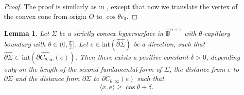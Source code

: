 \documentclass[11pt,reqno]{amsart}
\newtheorem{lem}[thm]{Lemma}
\theoremstyle{definition}
\theoremstyle{remark}
\numberwithin{equation}{section}
\renewcommand{\(}{\left(}
\renewcommand{\)}{\right)}
\renewcommand{\-}{\overline}
\begin{document}
\begin{proof}
	The proof is similarly as in \cite[Lemma 10]{Lambert-Scheuer2016}, except that now we translate the vertex of the convex cone from origin $O$ to $\cos\theta e_0$.
\end{proof}
\begin{lem}\label{Lem-es-height}
	Let $\Sigma$ be a strictly convex hypersurface in $\bar{\mathbb{B}}^{n+1}$ with $\theta$-capillary boundary with $\theta\in(0,\frac{\pi}{2}]$. Let $e\in\mathrm{int}(\widehat{\partial\Sigma})$ be a direction, such that $\widehat{\partial\Sigma}\subset\mathrm{int}(\widehat{\partial C_{\theta,\infty}}(e))$. Then there exists a positive constant $\delta>0$, depending only on the length of the second fundamental form of $\Sigma$, the distance from $e$ to $\partial\Sigma$ and the distance from $\partial\Sigma$ to $\partial C_{\theta,\infty}(e)$ such that
	\begin{equation}
		\langle x,e\rangle\geq \cos\theta+\delta.
	\end{equation}
\end{lem}
\end{document}

